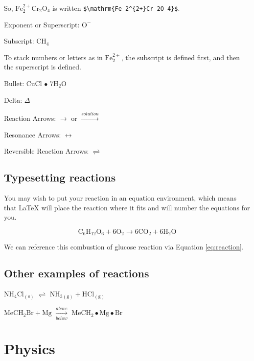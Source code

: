 \documentclass[12pt,twoside]{reedthesis}
\theoremstyle{definition}
\theoremstyle{definition}
\theoremstyle{remark}
\begin{document}
  So, \(\mathrm{Fe_2^{2+}Cr_2O_4}\) is written
  \texttt{\$\textbackslash{}mathrm\{Fe\_2\^{}\{2+\}Cr\_2O\_4\}\$}.
  
  \noindent Exponent or Superscript: \(\mathrm{O^-}\)
  
  \noindent Subscript: \(\mathrm{CH_4}\)
  
  To stack numbers or letters as in \(\mathrm{Fe_2^{2+}}\), the subscript
  is defined first, and then the superscript is defined.
  
  \noindent Bullet: CuCl \(\bullet\) \(\mathrm{7H_{2}O}\)
  
  \noindent Delta: \(\Delta\)
  
  \noindent Reaction Arrows: \(\longrightarrow\) or
  \(\xrightarrow{solution}\)
  
  \noindent Resonance Arrows: \(\leftrightarrow\)
  
  \noindent Reversible Reaction Arrows: \(\rightleftharpoons\)
  
  \subsection{Typesetting reactions}\label{typesetting-reactions}
  
  You may wish to put your reaction in an equation environment, which
  means that LaTeX will place the reaction where it fits and will number
  the equations for you.
  
  \begin{equation}
    \mathrm{C_6H_{12}O_6  + 6O_2} \longrightarrow \mathrm{6CO_2 + 6H_2O}
    \label{eq:reaction}
  \end{equation}
  
  We can reference this combustion of glucose reaction via Equation
  \eqref{eq:reaction}.
  
  \subsection{Other examples of
  reactions}\label{other-examples-of-reactions}
  
  \(\mathrm{NH_4Cl_{(s)}}\) \(\rightleftharpoons\)
  \(\mathrm{NH_{3(g)}+HCl_{(g)}}\)
  
  \noindent \(\mathrm{MeCH_2Br + Mg}\) \(\xrightarrow[below]{above}\)
  \(\mathrm{MeCH_2\bullet Mg \bullet Br}\)
  
  \section{Physics}\label{physics}
  
\end{document}
